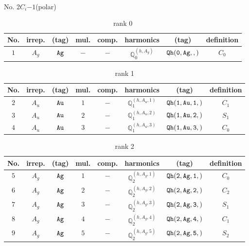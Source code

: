 \documentclass[fleqn,8pt]{jsarticle}
\begin{document}
\setcounter{MaxMatrixCols}{16}

\begin{center}
\LARGE
No. 2\quad$C_{i}$\quad$-1$\quad[ triclinic ] (polar)
\end{center}
\begin{table}[ht!]
\begin{center}
\caption{rank 0}
\renewcommand{\arraystretch}{1.3}
\begin{tabular}{cccccccc} \hline \hline
No. & irrep. & (tag) & mul. & comp. & harmonics & (tag) & definition \\ \hline
$ 1 $ & $ A_{g} $ & $ {\tt Ag} $ & $ - $ & $ - $ & $ \mathbb{Q}_{0}^{(h,A_{g})} $ & $ {\tt Qh(0,Ag,,)} $ & $ C_{0} $ \\
 \hline \hline
\end{tabular}
\end{center}
\end{table}
\begin{table}[ht!]
\begin{center}
\caption{rank 1}
\renewcommand{\arraystretch}{1.3}
\begin{tabular}{cccccccc} \hline \hline
No. & irrep. & (tag) & mul. & comp. & harmonics & (tag) & definition \\ \hline
$ 2 $ & $ A_{u} $ & $ {\tt Au} $ & $ 1 $ & $ - $ & $ \mathbb{Q}_{1}^{(h,A_{u},1)} $ & $ {\tt Qh(1,Au,1,)} $ & $ C_{1} $ \\
$ 3 $ & $ A_{u} $ & $ {\tt Au} $ & $ 2 $ & $ - $ & $ \mathbb{Q}_{1}^{(h,A_{u},2)} $ & $ {\tt Qh(1,Au,2,)} $ & $ S_{1} $ \\
$ 4 $ & $ A_{u} $ & $ {\tt Au} $ & $ 3 $ & $ - $ & $ \mathbb{Q}_{1}^{(h,A_{u},3)} $ & $ {\tt Qh(1,Au,3,)} $ & $ C_{0} $ \\
 \hline \hline
\end{tabular}
\end{center}
\end{table}
\begin{table}[ht!]
\begin{center}
\caption{rank 2}
\renewcommand{\arraystretch}{1.3}
\begin{tabular}{cccccccc} \hline \hline
No. & irrep. & (tag) & mul. & comp. & harmonics & (tag) & definition \\ \hline
$ 5 $ & $ A_{g} $ & $ {\tt Ag} $ & $ 1 $ & $ - $ & $ \mathbb{Q}_{2}^{(h,A_{g},1)} $ & $ {\tt Qh(2,Ag,1,)} $ & $ C_{0} $ \\
$ 6 $ & $ A_{g} $ & $ {\tt Ag} $ & $ 2 $ & $ - $ & $ \mathbb{Q}_{2}^{(h,A_{g},2)} $ & $ {\tt Qh(2,Ag,2,)} $ & $ C_{2} $ \\
$ 7 $ & $ A_{g} $ & $ {\tt Ag} $ & $ 3 $ & $ - $ & $ \mathbb{Q}_{2}^{(h,A_{g},3)} $ & $ {\tt Qh(2,Ag,3,)} $ & $ S_{1} $ \\
$ 8 $ & $ A_{g} $ & $ {\tt Ag} $ & $ 4 $ & $ - $ & $ \mathbb{Q}_{2}^{(h,A_{g},4)} $ & $ {\tt Qh(2,Ag,4,)} $ & $ C_{1} $ \\
$ 9 $ & $ A_{g} $ & $ {\tt Ag} $ & $ 5 $ & $ - $ & $ \mathbb{Q}_{2}^{(h,A_{g},5)} $ & $ {\tt Qh(2,Ag,5,)} $ & $ S_{2} $ \\
 \hline \hline
\end{tabular}
\end{center}
\end{table}
\end{document}
